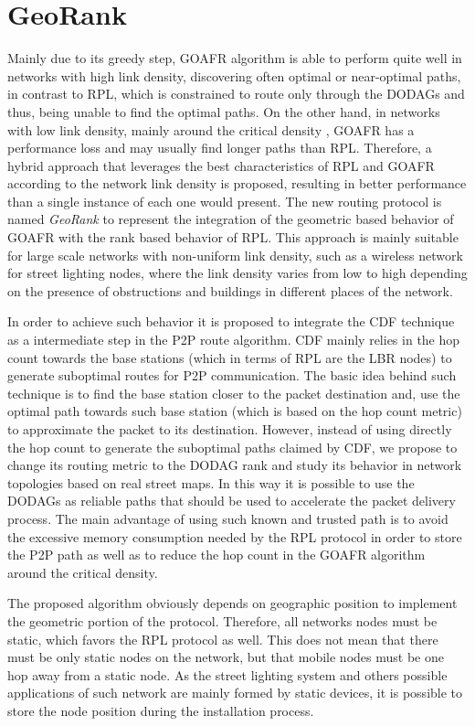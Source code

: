 \documentclass[final,authoryear,3p,twocolumn]{elsarticle}
\begin{document}
\section{GeoRank}
\label{secGeoRank}

Mainly due to its greedy step, GOAFR algorithm is able to perform quite well in networks with high link density, discovering often optimal or near-optimal paths, in contrast to RPL, which is constrained to route only through the DODAGs and thus, being unable to find the optimal paths. On the other hand, in networks with low link density, mainly around the critical density \citep{GOAFR_2008}, GOAFR has a performance loss and may usually find longer paths than RPL. Therefore, a hybrid approach that leverages the best characteristics of RPL and GOAFR according to the network link density is proposed, resulting in better performance than a single instance of each one would present. The new routing protocol is named \textit{GeoRank} to represent the integration of the geometric based behavior of GOAFR with the rank based behavior of RPL. This approach is mainly suitable for large scale networks with non-uniform link density, such as a wireless network for street lighting nodes, where the link density varies from low to high depending on the presence of obstructions and buildings in different places of the network.

In order to achieve such behavior it is proposed to integrate the CDF technique as a intermediate step in the P2P route algorithm. CDF mainly relies in the hop count towards the base stations (which in terms of RPL are the LBR nodes) to generate suboptimal routes for P2P communication. The basic idea behind such technique is to find the base station closer to the packet destination and, use the optimal path towards such base station (which is based on the hop count metric) to approximate the packet to its destination. However, instead of using directly the hop count to generate the suboptimal paths claimed by CDF, we propose to change its routing metric to the DODAG rank and study its behavior in network topologies based on real street maps. In this way it is possible to use the DODAGs as reliable paths that should be used to accelerate the packet delivery process. The main advantage of using such known and trusted path is to avoid the excessive memory consumption needed by the RPL protocol in order to store the P2P path as well as to reduce the hop count in the GOAFR algorithm around the critical density.

The proposed algorithm obviously depends on geographic position to implement the geometric portion of the protocol. Therefore, all networks nodes must be static, which favors the RPL protocol as well. This does not mean that there must be only static nodes on the network, but that mobile nodes must be one hop away from a static node. As the street lighting system and others possible applications of such network are mainly formed by static devices, it is possible to store the node position during the installation process.
\end{document}
